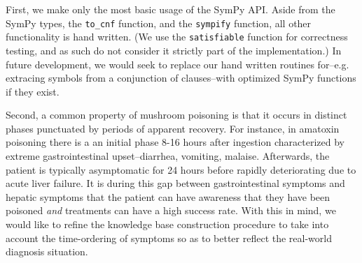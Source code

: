 \documentclass[12pt, conference, compsocconf]{IEEEtran}
\begin{document}
First, we make only the most basic usage of the SymPy API. 
Aside from the SymPy types, the \texttt{to\_cnf} function, and the \texttt{sympify} function, all other functionality is hand written. 
(We use the \texttt{satisfiable} function for correctness testing, and as such do not consider it strictly part of the implementation.) 
In future development, we would seek to replace our hand written routines for--e.g. extracing symbols from a conjunction of clauses--with optimized SymPy functions if they exist. 

Second, a common property of mushroom poisoning is that it occurs in distinct phases punctuated by periods of apparent recovery. 
For instance, in amatoxin poisoning there is a an initial phase 8-16 hours after ingestion characterized by extreme gastrointestinal upset--diarrhea, vomiting, malaise.
Afterwards, the patient is typically asymptomatic for 24 hours before rapidly deteriorating due to acute liver failure. 
It is during this gap between gastrointestinal symptoms and hepatic symptoms that the patient can have awareness that they have been poisoned \emph{and} treatments can have a high success rate. 
With this in mind, we would like to refine the knowledge base construction procedure to take into account the time-ordering of symptoms so as to better reflect the real-world diagnosis situation. 




\end{document}
